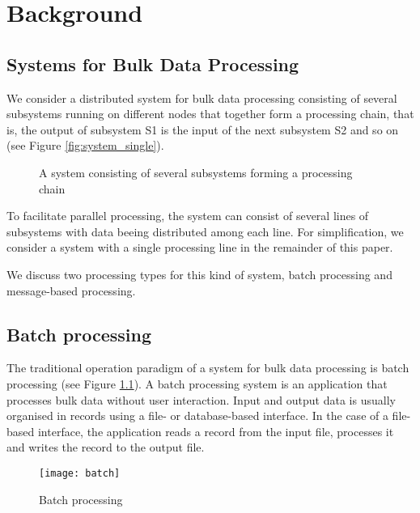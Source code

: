 \chapter{Background}\label{ch:background}

\section{Systems for Bulk Data Processing}

We consider a distributed system for bulk data processing consisting of several subsystems running on different nodes that together form a processing chain, that is, the output of subsystem S1 is the input of the next subsystem S2 and so on (see Figure \ref{fig:system_single}).


\begin{figure}[htbp]
	\centering
	\mbox{}
	\mbox{}
	\caption{A system consisting of several subsystems forming a processing chain}
\end{figure}

To facilitate parallel processing, the system can consist of several lines of subsystems with data beeing distributed among each line. For simplification, we consider a system with a single processing line in the remainder of this paper.

We discuss two processing types for this kind of system, batch processing and message-based processing.

\section{Batch processing}\label{sec:batch_processing}
The traditional operation paradigm of a system for bulk data processing is batch processing (see Figure \ref{fig:batch_processing}). A batch processing system is an application that processes bulk data without user interaction. Input and output data is usually organised in records using a file- or database-based interface. In the case of a file-based interface, the application reads a record from the input file, processes it and writes the record to the output file.
\begin{figure}[htbp]
	\centering
	\texttt{[image: batch]}
	\caption{Batch processing}
	\label{fig:batch_processing}
\end{figure}

